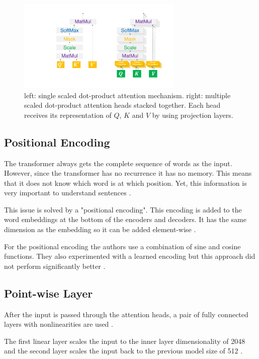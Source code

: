 \begin{figure}[htp]
	\centering
	\includegraphics[width=0.7\textwidth]{figures/03_theory/03_transformer_ScaledDot}
	\caption{left: single scaled dot-product attention mechanism. right: multiple scaled dot-product attention heads stacked together. Each head receives its representation of $Q$, $K$ and $V$ by using projection layers.}
	\label{fig:03_transformer_scaledDotProduct}
\end{figure}

\subsection{Positional Encoding}

The transformer always gets the complete sequence of words as the input. However, since the transformer has no recurrence it has no memory. This means that it does not know which word is at which position. Yet, this information is very important to understand sentences \cite{Vaswani2017d}. 
\medskip

This issue is solved by a "positional encoding". This encoding is added to the word embeddings at the bottom of the encoders and decoders. It has the same dimension as the embedding so it can be added element-wise \cite{Vaswani2017d}.

For the positional encoding the authors use a combination of sine and cosine functions. They also experimented with a learned encoding but this approach did not perform significantly better \cite{Vaswani2017d}.

\subsection{Point-wise Layer}

After the input is passed through the attention heads, a pair of fully connected layers with nonlinearities are used \cite{Vaswani2017d}. 

The first linear layer scales the input to the inner layer dimensionality of 2048 and the second layer scales the input back to the previous model size of 512 \cite{Vaswani2017d}.

